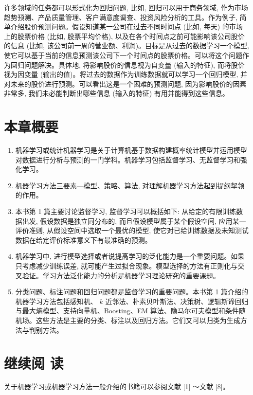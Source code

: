 \documentclass[10pt]{article}
\begin{document}
许多领域的任务都可以形式化为回归问题, 比如, 回归可以用于商务领域, 作为市场趋势预测、产品质量管理、客户满意度调查、投资风险分析的工具。作为例子, 简单介绍股价预测问题。假设知道某一公司在过去不同时间点 (比如, 每天) 的市场上的股票价格 (比如, 股票平均价格), 以及在各个时间点之前可能影响该公司股价的信息 (比如, 该公司前一周的营业额、利润)。目标是从过去的数据学习一个模型, 使它可以基于当前的信息预测该公司下一个时间点的股票价格。可以将这个问题作为回归问题解决。具体地, 将影响股价的信息视为自变量 (输入的特征), 而将股价视为因变量 (输出的值)。将过去的数据作为训练数据就可以学习一个回归模型, 并对未来的股价进行预测。可以看出这是一个困难的预测问题, 因为影响股价的因素非常多, 我们未必能判断出哪些信息 (输入的特征) 有用并能得到这些信息。

\section*{本章概要}
\begin{enumerate}
  \item 机器学习或统计机器学习是关于计算机基于数据构建概率统计模型并运用模型对数据进行分析与预测的一门学科。机器学习包括监督学习、无监督学习和强化学习。

  \item 机器学习方法三要素—模型、策略、算法, 对理解机器学习方法起到提纲挈领的作用。

  \item 本书第 1 篇主要讨论监督学习, 监督学习可以概括如下: 从给定的有限训练数据出发, 假设数据是独立同分布的, 而且假设模型属于某个假设空间, 应用某一评价准则, 从假设空间中选取一个最优的模型, 使它对已给训练数据及未知测试数据在给定评价标准意义下有最准确的预测。

  \item 机器学习中, 进行模型选择或者说提高学习的泛化能力是一个重要问题。如果只考虑减少训练误差, 就可能产生过拟合现象。模型选择的方法有正则化与交叉验证。学习方法泛化能力的分析是机器学习理论研究的重要课题。

  \item 分类问题、标注问题和回归问题都是监督学习的重要问题。本书第 1 篇介绍的机器学习方法包括感知机、 $k$ 近邻法、朴素贝叶斯法、决策树、逻辑斯谛回归与最大熵模型、支持向量机、Boosting、EM 算法、隐马尔可夫模型和条件随机场。这些方法是主要的分类、标注以及回归方法。它们又可以归类为生成方法与判别方法。

\end{enumerate}

\section*{继续阅 读}
关于机器学习或机器学习方法一般介绍的书籍可以参阅文献 [1] ～文献 [8]。
\end{document}

